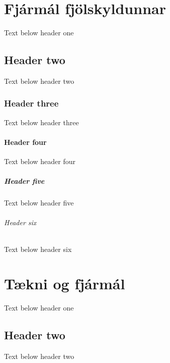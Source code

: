 \documentclass[a4paper,10pt,icelandic]{sphinxmanual}
\begin{document}
\sphinxstepscope


\chapter{Fjármál fjölskyldunnar}
\label{\detokenize{fjarmal-fjolskyldunnar/index:fjarmal-fjolskyldunnar}}\label{\detokenize{fjarmal-fjolskyldunnar/index::doc}}
\sphinxAtStartPar
Text below header one


\section{Header two}
\label{\detokenize{fjarmal-fjolskyldunnar/index:header-two}}
\sphinxAtStartPar
Text below header two


\subsection{Header three}
\label{\detokenize{fjarmal-fjolskyldunnar/index:header-three}}
\sphinxAtStartPar
Text below header three


\subsubsection{Header four}
\label{\detokenize{fjarmal-fjolskyldunnar/index:header-four}}
\sphinxAtStartPar
Text below header four


\paragraph{Header five}
\label{\detokenize{fjarmal-fjolskyldunnar/index:header-five}}
\sphinxAtStartPar
Text below header five


\subparagraph{Header six}
\label{\detokenize{fjarmal-fjolskyldunnar/index:header-six}}
\sphinxAtStartPar
Text below header six

\sphinxstepscope


\chapter{Tækni og fjármál}
\label{\detokenize{taekni-og-fjarmal/index:taekni-og-fjarmal}}\label{\detokenize{taekni-og-fjarmal/index::doc}}
\sphinxAtStartPar
Text below header one


\section{Header two}
\label{\detokenize{taekni-og-fjarmal/index:header-two}}
\sphinxAtStartPar
Text below header two
\end{document}
